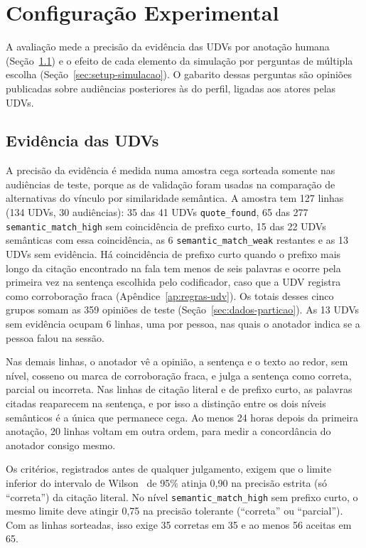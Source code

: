 \section{Configura\c{c}\~ao Experimental}
\label{sec:setup}

A avaliação mede a precisão da evidência das UDVs por anotação humana (Seção~\ref{sec:setup-udv}) e
o efeito de cada elemento da simulação por perguntas de múltipla escolha
(Seção~\ref{sec:setup-simulacao}). O gabarito dessas perguntas são opiniões publicadas sobre
audiências posteriores às do perfil, ligadas aos atores pelas UDVs.

\subsection{Evidência das UDVs}
\label{sec:setup-udv}

A precisão da evidência é medida numa amostra cega sorteada somente nas audiências de teste, porque
as de validação foram usadas na comparação de alternativas do vínculo por similaridade semântica. A
amostra tem 127 linhas (134 UDVs, 30 audiências): 35 das 41 UDVs \texttt{quote\_found}, 65 das 277
\texttt{semantic\_match\_high} sem coincidência de prefixo curto, 15 das 22 UDVs semânticas com essa
coincidência, as 6 \texttt{semantic\_match\_weak} restantes e as 13 UDVs sem evidência. Há
coincidência de prefixo curto quando o prefixo mais longo da citação encontrado na fala tem menos de
seis palavras e ocorre pela primeira vez na sentença escolhida pelo codificador, caso que a UDV
registra como corroboração fraca (Apêndice~\ref{ap:regras-udv}). Os totais desses cinco grupos somam as 359 opiniões de teste
(Seção~\ref{sec:dados-particao}). As 13 UDVs sem evidência ocupam 6 linhas, uma por pessoa, nas quais
o anotador indica se a pessoa falou na sessão.

Nas demais linhas, o anotador vê a opinião, a sentença e o texto ao redor, sem nível, cosseno ou
marca de corroboração fraca, e julga a sentença como correta, parcial ou incorreta. Nas linhas de
citação literal e de prefixo curto, as palavras citadas reaparecem na sentença, e por isso a
distinção entre os dois níveis semânticos é a única que permanece cega. Ao menos 24 horas depois da
primeira anotação, 20 linhas voltam em outra ordem, para medir a concordância do anotador consigo
mesmo.

Os critérios, registrados antes de qualquer julgamento, exigem que o limite inferior do intervalo de
Wilson~\citep{wilson1927probable} de 95\% atinja 0,90 na precisão estrita (só ``correta'') da citação
literal. No nível \texttt{semantic\_match\_high} sem prefixo curto, o mesmo limite deve atingir 0,75
na precisão tolerante (``correta'' ou ``parcial''). Com as linhas sorteadas, isso exige 35 corretas
em 35 e ao menos 56 aceitas em 65.

